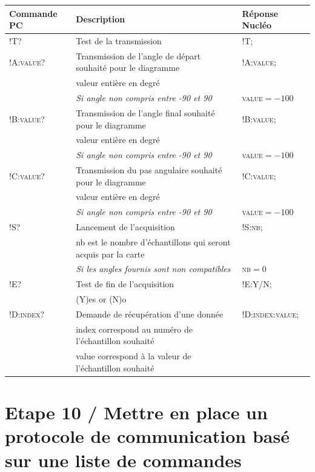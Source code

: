 \documentclass[a4paper,11pt,titlepage]{article} %
\begin{document}
\begin{center}

\begin{tabular}{|l|l|l|}
\hline 
\textbf{Commande PC} & Description & \textbf{Réponse Nucléo} \\ 
\hline 
\textsc{!T?} & Test de la transmission & \textsc{!T;} \\ 
\hline 
\textsc{!A:value?} & Transmission de l'angle de départ souhaité pour le diagramme & \textsc{!A:value;} \\ 
 &  valeur entière en degré &  \\
 & \textit{Si angle non compris entre -90 et 90} & \textsc{value}$ = -100$ \\ 
\hline 
\textsc{!B:value?} & Transmission de l'angle final souhaité pour le diagramme & \textsc{!B:value;} \\ 
 &  valeur entière en degré &  \\ 
 & \textit{Si angle non compris entre -90 et 90} & \textsc{value}$ = -100$ \\
\hline 
\textsc{!C:value?} & Transmission du pas angulaire souhaité pour le diagramme & \textsc{!C:value;} \\ 
 &  valeur entière en degré &  \\ 
 & \textit{Si angle non compris entre -90 et 90} & \textsc{value}$ = -100$ \\
\hline 
\textsc{!S?} & Lancement de l'acquisition & \textsc{!S:nb;} \\ 
 &  nb est le nombre d'échantillons qui seront acquis par la carte &  \\ 
 & \textit{Si les angles fournis sont non compatibles} & \textsc{nb}$ = 0$ \\
\hline 
\textsc{!E?} & Test de fin de l'acquisition & \textsc{!E:Y/N;} \\
 &  (Y)es or (N)o &  \\  
\hline 
\textsc{!D:index?} & Demande de récupération d'une donnée & \textsc{!D:index:value;} \\
 &  index correspond au numéro de l'échantillon souhaité &  \\  
 &  value correspond à la valeur de l'échantillon souhaité &  \\  
\hline 
\end{tabular} 

\end{center}

\section{Etape 10 / Mettre en place un protocole de communication basé sur une liste de commandes}
\end{document}

